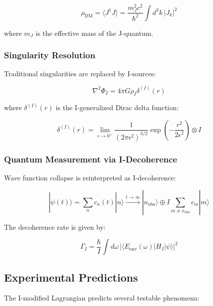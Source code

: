\begin{equation}
\label{eq:j_condensate}
\rho_{\text{DM}} = \langle J^{\dagger}J \rangle = \frac{m_J^2 c^2}{\hbar^2} \int d^3k\, |J_k|^2
\end{equation}

where $m_J$ is the effective mass of the J-quantum.

\subsubsection{Singularity Resolution}

Traditional singularities are replaced by I-sources:

\begin{equation}
\label{eq:i_source}
\nabla^2 \Phi_I = 4\pi G \rho_I \delta^{(I)}(r)
\end{equation}

where $\delta^{(I)}(r)$ is the I-generalized Dirac delta function:

\begin{equation}
\label{eq:i_delta}
\delta^{(I)}(r) = \lim_{\epsilon\to 0^+} \frac{1}{(2\pi\epsilon^2)^{3/2}} \exp\left(-\frac{r^2}{2\epsilon^2}\right) \otimes I
\end{equation}

\subsubsection{Quantum Measurement via I-Decoherence}

Wave function collapse is reinterpreted as I-decoherence:

\begin{equation}
\label{eq:i_decoherence}
|\psi(t)\rangle = \sum_n c_n(t) |n\rangle \xrightarrow{t\to\infty} |n_{\text{obs}}\rangle \oplus I\sum_{m\neq n_{\text{obs}}} c_m |m\rangle
\end{equation}

The decoherence rate is given by:

\begin{equation}
\label{eq:decoherence_rate}
\Gamma_I = \frac{\hbar}{I} \int d\omega\, |\langle E_{\text{env}}(\omega) | H_I | \psi\rangle|^2
\end{equation}

\subsection{Experimental Predictions}

The I-modified Lagrangian predicts several testable phenomena:

